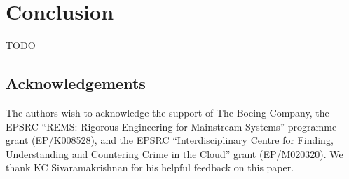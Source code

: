 \documentclass[11pt]{article}
\begin{document}
\section{Conclusion}

TODO

\subsection*{Acknowledgements}

The authors wish to acknowledge the support of The Boeing Company,
the EPSRC ``REMS: Rigorous Engineering for Mainstream Systems'' programme grant (EP/K008528), and
the EPSRC ``Interdisciplinary Centre for Finding, Understanding and Countering Crime in the Cloud'' grant (EP/M020320).
We thank KC Sivaramakrishnan for his helpful feedback on this paper.


{}
\end{document}

